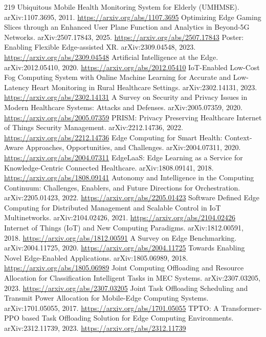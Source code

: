 \documentclass[11pt]{article}
\begin{document}
\begin{thebibliography}{219}
 Ubiquitous Mobile Health Monitoring System for Elderly (UMHMSE). arXiv:1107.3695, 2011. \url{https://arxiv.org/abs/1107.3695}
 Optimizing Edge Gaming Slices through an Enhanced User Plane Function and Analytics in Beyond-5G Networks. arXiv:2507.17843, 2025. \url{https://arxiv.org/abs/2507.17843}
 Poster: Enabling Flexible Edge-assisted XR. arXiv:2309.04548, 2023. \url{https://arxiv.org/abs/2309.04548}
 Artificial Intelligence at the Edge. arXiv:2012.05410, 2020. \url{https://arxiv.org/abs/2012.05410}
 IoT-Enabled Low-Cost Fog Computing System with Online Machine Learning for Accurate and Low-Latency Heart Monitoring in Rural Healthcare Settings. arXiv:2302.14131, 2023. \url{https://arxiv.org/abs/2302.14131}
 A Survey on Security and Privacy Issues in Modern Healthcare Systems: Attacks and Defenses. arXiv:2005.07359, 2020. \url{https://arxiv.org/abs/2005.07359}
 PRISM: Privacy Preserving Healthcare Internet of Things Security Management. arXiv:2212.14736, 2022. \url{https://arxiv.org/abs/2212.14736}
 Edge Computing for Smart Health: Context-Aware Approaches, Opportunities, and Challenges. arXiv:2004.07311, 2020. \url{https://arxiv.org/abs/2004.07311}
 EdgeLaaS: Edge Learning as a Service for Knowledge-Centric Connected Healthcare. arXiv:1808.09141, 2018. \url{https://arxiv.org/abs/1808.09141}
 Autonomy and Intelligence in the Computing Continuum: Challenges, Enablers, and Future Directions for Orchestration. arXiv:2205.01423, 2022. \url{https://arxiv.org/abs/2205.01423}
 Software Defined Edge Computing for Distributed Management and Scalable Control in IoT Multinetworks. arXiv:2104.02426, 2021. \url{https://arxiv.org/abs/2104.02426}
 Internet of Things (IoT) and New Computing Paradigms. arXiv:1812.00591, 2018. \url{https://arxiv.org/abs/1812.00591}
 A Survey on Edge Benchmarking. arXiv:2004.11725, 2020. \url{https://arxiv.org/abs/2004.11725}
 Towards Enabling Novel Edge-Enabled Applications. arXiv:1805.06989, 2018. \url{https://arxiv.org/abs/1805.06989}
 Joint Computing Offloading and Resource Allocation for Classification Intelligent Tasks in MEC Systems. arXiv:2307.03205, 2023. \url{https://arxiv.org/abs/2307.03205}
 Joint Task Offloading Scheduling and Transmit Power Allocation for Mobile-Edge Computing Systems. arXiv:1701.05055, 2017. \url{https://arxiv.org/abs/1701.05055}
 TPTO: A Transformer-PPO based Task Offloading Solution for Edge Computing Environments. arXiv:2312.11739, 2023. \url{https://arxiv.org/abs/2312.11739}

\end{thebibliography}
\end{document}
